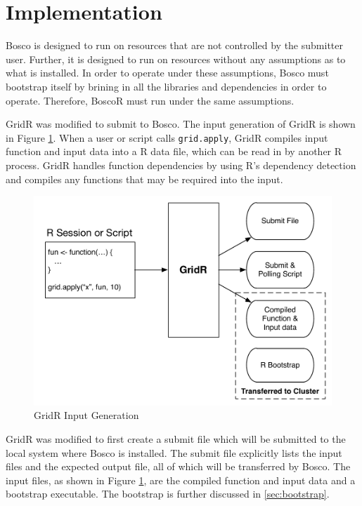 \documentclass[conference]{IEEEtran}
\begin{document}
\section{Implementation}
\label{sec:implementation}


Bosco is designed to run on resources that are not controlled by the submitter user.  Further, it is designed to run on resources without any assumptions as to what is installed.  In order to operate under these assumptions, Bosco must bootstrap itself by brining in all the libraries and dependencies in order to operate.  Therefore, BoscoR must run under the same assumptions.

GridR was modified to submit to Bosco.  The input generation of GridR is shown in Figure \ref{fig:gridrinput}.  When a user or script calls \texttt{grid.apply}, GridR compiles  input function and input data into a R data file, which can be read in by another R process.  GridR handles function dependencies by using R's dependency detection and compiles any functions that may be required into the input.  

\begin{figure}[ht]
\centering
\includegraphics[width=.4\textwidth]{images/InputDiagram.pdf}
\caption{GridR Input Generation}
\label{fig:gridrinput}
\end{figure}

GridR was modified to first create a submit file which will be submitted to the local system where Bosco is installed.  The submit file explicitly lists the input files and the expected output file, all of which will be transferred by Bosco.  The input files, as shown in Figure \ref{fig:gridrinput}, are the compiled function and input data and a bootstrap executable. The bootstrap is further discussed in \ref{sec:bootstrap}.
\end{document}

